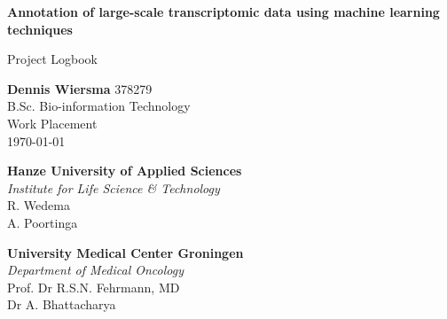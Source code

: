 \begin{titlepage}
    \begin{center}
        \textbf{\LARGE Annotation of large-scale transcriptomic data using machine learning techniques}

        \vspace{0.5cm}
        \Large Project Logbook

        \vspace{1.5cm}

    \end{center}

    \vfill

    \begin{flushright}
        \textbf{Dennis Wiersma} 378279 \\
        B.Sc. Bio-information Technology \\
        Work Placement \\
        \longdate
        \today

        \vspace{1cm}

        \textbf{Hanze University of Applied Sciences} \\
        \textit{Institute for Life Science \& Technology} \\
        R. Wedema \\
        A. Poortinga

        \textbf{University Medical Center Groningen} \\
        \textit{Department of Medical Oncology} \\
        Prof. Dr R.S.N. Fehrmann, MD \\
        Dr A. Bhattacharya

    \end{flushright}
\end{titlepage}
